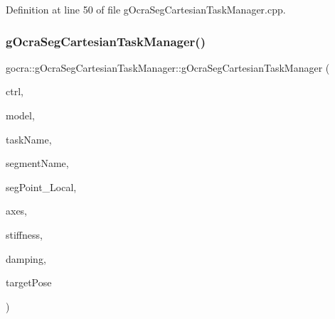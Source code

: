 Definition at line 50 of file g\+Ocra\+Seg\+Cartesian\+Task\+Manager.\+cpp.

\hypertarget{classgocra_1_1gOcraSegCartesianTaskManager_a14780eadde3c5c3c9d3d92b011e0003b}{}\label{classgocra_1_1gOcraSegCartesianTaskManager_a14780eadde3c5c3c9d3d92b011e0003b} 
\subsubsection{\texorpdfstring{g\+Ocra\+Seg\+Cartesian\+Task\+Manager()}{gOcraSegCartesianTaskManager()}\hspace{0.1cm}{\footnotesize\ttfamily [4/4]}}
{\footnotesize\ttfamily gocra\+::g\+Ocra\+Seg\+Cartesian\+Task\+Manager\+::g\+Ocra\+Seg\+Cartesian\+Task\+Manager (\begin{DoxyParamCaption}\item[{\hyperlink{classgocra_1_1GHCJTController}{G\+H\+C\+J\+T\+Controller} \&}]{ctrl,  }\item[{const \hyperlink{classocra_1_1Model}{ocra\+::\+Model} \&}]{model,  }\item[{const std\+::string \&}]{task\+Name,  }\item[{const std\+::string \&}]{segment\+Name,  }\item[{const Eigen\+::\+Vector3d \&}]{seg\+Point\+\_\+\+Local,  }\item[{\hyperlink{namespaceocra_a436781c7059a0f76027df1c652126260}{ocra\+::\+E\+Cartesian\+Dof}}]{axes,  }\item[{double}]{stiffness,  }\item[{double}]{damping,  }\item[{const Eigen\+::\+Vector3d \&}]{target\+Pose }\end{DoxyParamCaption})}

\hypertarget{classgocra_1_1gOcraSegCartesianTaskManager_a859cbd42a2beb4eff0e68ee014d9009f}{}\label{classgocra_1_1gOcraSegCartesianTaskManager_a859cbd42a2beb4eff0e68ee014d9009f} 
